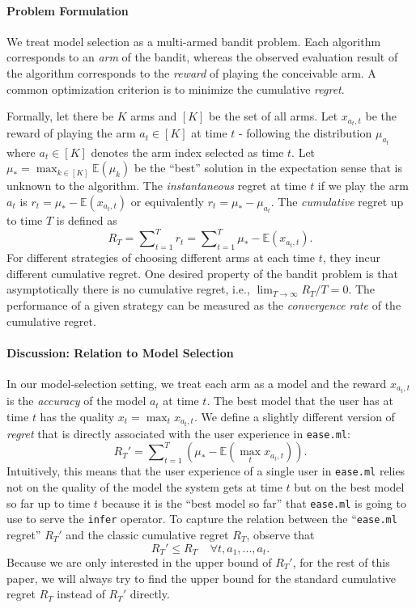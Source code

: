 \documentclass[letterpaper]{vldb}
\newcommand{\eml}{\texttt{ease.ml}\xspace}
\newcommand{\E}{\mathbb{E}}
\begin{document}
\paragraph*{Problem Formulation} We treat
model selection as a multi-armed bandit problem.
Each algorithm corresponds to an \emph{arm} of 
the bandit, whereas the observed evaluation result of 
the algorithm corresponds to the \emph{reward} of playing the conceivable arm.
A common optimization criterion is to minimize the cumulative
\emph{regret}.


Formally, let there be $K$ arms and $[K]$ be the set of
all arms. Let $x_{a_t, t}$ be the reward of playing the arm $a_t\in[K]$
at time $t$ - following the distribution $\mu_{a_t}$ where $a_t \in [K]$ denotes the arm index selected as time $t$. Let $\mu_*=\max_{k\in[K]}\mathbb{E}(\mu_k)$ be the ``best'' solution in the expectation sense that is unknown to the algorithm.
The {\em instantaneous} regret at time $t$ if we
play the arm $a_t$ is $r_t=\mu_*-\E(x_{a_t, t})$ or equivalently $r_t = \mu_*-\mu_{a_t}$.
The {\em cumulative} regret up to time $T$ is defined as
\[
R_{T}=\sum\nolimits_{t=1}^{T}r_t = \sum\nolimits_{t=1}^{T} \mu_*-\E(x_{a_t, t}) .
\]
For different strategies of choosing different arms at
each time $t$, they incur different cumulative regret.
One desired property of the bandit problem is 
that asymptotically there is no cumulative regret, i.e.,
$\lim\nolimits_{T\to\infty}R_T/T=0.$ The performance
of a given strategy can be measured as the {\em convergence rate}
of the cumulative regret.


\vspace{-1em}
\paragraph*{Discussion: Relation to Model Selection} 
In our model-selection setting, we treat each arm as
a model and the reward $x_{a_t, t}$ is the {\em accuracy} of
the model $a_t$ at time $t$. The best model that the user
has at time $t$ has the quality $x_t = \max_t x_{a_t, t}$. We
define a slightly different version of {\em regret} that is
directly associated with the user experience in \eml:
\[
R_{T}' = \sum\nolimits_{t=1}^{T} \left(\mu_* -  \mathbb{E}(\max_t x_{a_t, t})\right).
\]
Intuitively, this means that the user experience of a single
user in \eml relies not on the quality of the model the system
gets at time $t$ but on the best model so far up to time $t$ because
it is the ``best model so far'' that \eml is going to use 
to serve the \texttt{infer} operator. To
capture the relation between the ``\eml regret'' $R_T'$ and 
the classic cumulative regret $R_T$, observe that
\[
R_T' \leq R_T~~~~~\forall t, a_1,...,a_t.
\]
Because we are only interested in
the upper bound of $R_T'$, for the rest of this paper,
we will always try to find the upper bound for 
the standard cumulative regret $R_T$ instead of 
$R_T'$ directly.
\end{document}
